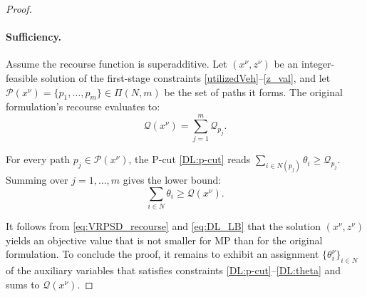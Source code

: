 \documentclass{article}
\begin{document}
\begin{proof}
\paragraph{Sufficiency.} Assume the recourse function is superadditive.
Let $(x^{\nu},z^{\nu})$ be an integer-feasible solution of the first-stage
constraints \eqref{utilizedVeh}--\eqref{z_val}, and let $\mathcal{P}(x^{\nu}) = \{p_1, \dots, p_m\} \in \Pi(N,m)$ be the set of paths it forms. The original formulation’s recourse evaluates to:
\begin{equation}\label{eq:VRPSD_recourse}
    \mathcal{Q}(x^{\nu}) = \sum_{j=1}^{m}\mathcal{Q}_{p_j}.
\end{equation}

For every path $p_j \in \mathcal{P}(x^{\nu})$, the P-cut \eqref{DL:p-cut} reads
$\sum_{i\in N(p_j)}\theta_i \ge \mathcal{Q}_{p_j}$. Summing over $j=1,\dots,m$ gives the lower bound:
\begin{equation}\label{eq:DL_LB}
    \sum_{i\in N}\theta_i \geq \mathcal{Q}(x^{\nu}).
\end{equation}

It follows from \eqref{eq:VRPSD_recourse} and \eqref{eq:DL_LB} that the solution $(x^{\nu},z^{\nu})$ yields an objective value that is not smaller for MP than for the original formulation. To conclude the proof, it remains to exhibit an assignment $\{\theta^{\nu}_i\}_{i \in N}$ of the auxiliary variables that satisfies constraints \eqref{DL:p-cut}--\eqref{DL:theta} and sums to $\mathcal{Q}(x^{\nu})$. 


\end{proof}
\end{document}
